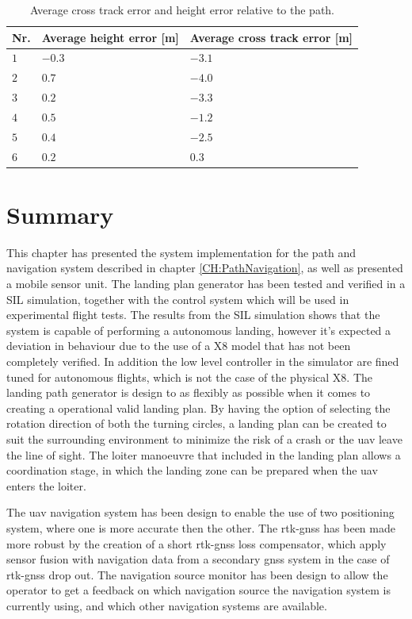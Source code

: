 \begin{table}[H]
\centering
\begin{tabular}{| l | l | l |}
\hline
\textbf{Nr.} 	& \textbf{Average height error [m]} 	& \textbf{Average cross track error [m]}  \\ \hline
$1$				& $-0.3$							& $-3.1$								\\ \hline
$2$				& $0.7$							& $-4.0$								\\ \hline
$3$				& $0.2$							& $-3.3$								\\ \hline
$4$				& $0.5$							& $-1.2$								\\ \hline
$5$				& $0.4$							& $-2.5$								\\ \hline
$6$				& $0.2$							& $0.3$								\\ \hline
\end{tabular}
\caption{Average cross track error and height error relative to the path.}
\label{Tb:SILAverageCrossHeight}
\end{table}
\section{Summary}
This chapter has presented the system implementation for the path and navigation system described in chapter \ref{CH:PathNavigation}, as well as presented a mobile sensor unit. The landing plan generator has been tested and verified in a SIL simulation, together with the control system which will be used in experimental flight tests. The results from the SIL simulation shows that the system is capable of performing a autonomous landing, however it's expected a deviation in behaviour due to the use of a X8 model that has not been completely verified. In addition the low level controller in the simulator are fined tuned for autonomous flights, which is not the case of the physical X8. The landing path generator is design to as flexibly as possible when it comes to creating a operational valid landing plan. By having the option of selecting the rotation direction of both the turning circles, a landing plan can be created to suit the surrounding environment to minimize the risk of a crash or the \gls{uav} leave the line of sight. The loiter manoeuvre that included in the landing plan allows a coordination stage, in which the landing zone can be prepared when the \gls{uav} enters the loiter. 

The \gls{uav} navigation system has been design to enable the use of two positioning system, where one is more accurate then the other. The \gls{rtk-gnss} has been made more robust by the creation of a short \gls{rtk-gnss} loss compensator, which apply sensor fusion with navigation data from a secondary \gls{gnss} system in the case of \gls{rtk-gnss} drop out. The navigation source monitor has been design to allow the operator to get a feedback on which navigation source the navigation system is currently using, and which other navigation systems are available.

